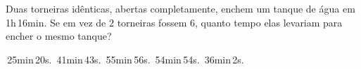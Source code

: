 Duas torneiras idênticas, abertas completamente, enchem um tanque de água em 1h\,16min. Se em vez de $2$ torneiras fossem $6$, quanto tempo elas levariam para encher o mesmo tanque?

\,25min\,20s.
\,41min\,43s.
\,55min\,56s.
\,54min\,54s.
\,36min\,2s.




